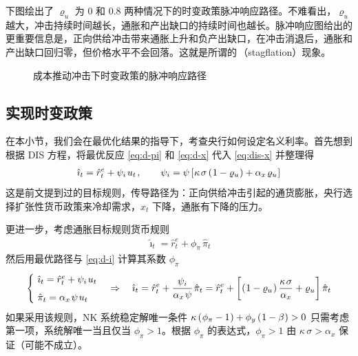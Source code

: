 下图绘出了 \(\varrho_u\) 为 0 和 0.8 两种情况下的时变政策脉冲响应路径。不难看出，\(\varrho_u\) 越大，冲击持续时间越长，通胀和产出缺口的持续时间也越长。脉冲响应图给出的更重要信息是，正向供给冲击带来通胀上升和负产出缺口，在冲击消退后，通胀和产出缺口回归零，但价格水平不会回落。这就是所谓的\,（stagflation）现象。

\begin{figure}[H]
    \centering
    \caption{成本推动冲击下时变政策的脉冲响应路径}
    \label{fig:disc-irf}
\end{figure}

\subsection{实现时变政策}

在本小节，我们会在最优化结果的指导下，考查央行如何设定名义利率。首先想到根据 DIS 方程，将最优反应 \ref{eq:d-pi} 和 \ref{eq:d-x} 代入 \ref{eq:dis-x} 并整理得
\begin{align}
    \hat \imath_t = \hat r_t^e + \psi_i\,u_t\,,
    \qquad \psi_i=\psi\bks{\kappa\,\sigma\bka{1-\varrho_u}+\alpha_x\,\varrho_u}\label{eq:d-i}
\end{align}
这是前文提到过的目标规则，传导路径为：正向供给冲击引起的通货膨胀，央行选择扩张性货币政策来冷却需求，\(\hat x_t\) 下降，通胀有下降的压力。

更进一步，考虑通胀目标规则货币规则
\begin{align*}
    \hat\imath_t=\hat r_t^e+\phi_\pi\,\hat\pi_t
\end{align*}
然后用最优路径与 \ref{eq:d-i} 计算其系数 \(\phi_\pi\)
\begin{align}
    \begin{cases}
        \ \hat\imath_t=\hat r_t^e+\psi_i\,u_t\\[4pt]
        \ \hat\pi_t=\alpha_x\,\psi\,u_t
    \end{cases}
    \Rightarrow\quad
    \hat\imath_t=\hat r_t^e+\dfrac{\psi_i}{\alpha_x\,\psi}\,\hat\pi_t=\hat r_t^e+\bks{\bka{1-\varrho_u}\dfrac{\kappa\,\sigma}{\alpha_x}+\varrho_u}\hat\pi_t\label{eq:pi-rule}
\end{align}
如果采用该规则，NK 系统稳定解唯一条件 \(\kappa\left(\mspace{1mu}\phi_\pi-1\mspace{1mu}\right)+\phi_y\left(\mspace{1mu}1-\beta\mspace{1mu}\right)>0\) 只需考虑第一项，系统解唯一当且仅当 \(\phi_\pi>1\)。根据 \(\phi_\pi\) 的表达式，\(\phi_\pi>1\) 由 \(\kappa\,\sigma>\alpha_x\) 保证（可能不成立）。

